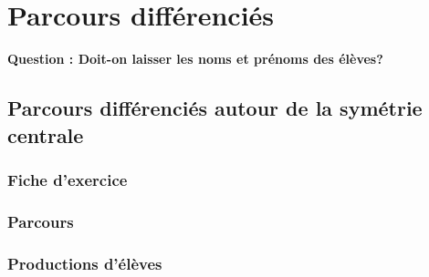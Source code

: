 \section{Parcours différenciés}
\textbf{\color{red}Question : Doit-on laisser les noms et prénoms des élèves?}
\subsection{Parcours différenciés autour de la symétrie centrale}
\subsubsection*{Fiche d'exercice}\label{parcours_symetrie_centrale}
\begin{figure}[!h]
\end{figure}
\subsubsection*{Parcours}
\subsubsection*{Productions d'élèves}\label{Prod_eleves_ju}
